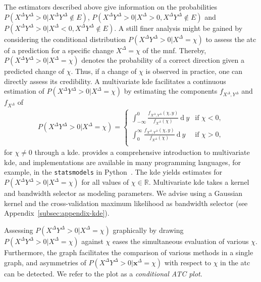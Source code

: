 \documentclass[pdflatex]{sn-jnl}
\theoremstyle{plain}%
\theoremstyle{definition}
\newcommand{\R}{\mathbb{R}}
\newcommand{\diffx}{\mathbf{x}^{\Delta}}
\newcommand{\diffxrv}{X^{\Delta}}
\newcommand{\diffyrv}{Y^{\Delta}}
\newcommand{\xcond}{\chi}
\begin{document}
The estimators described above give information on the probabilities $P(\diffxrv \diffyrv > 0 | \diffxrv \diffyrv \notin E)$, $P(\diffxrv \diffyrv > 0 | \diffxrv > 0, \diffxrv \diffyrv \notin E)$ and $P(\diffxrv \diffyrv > 0 | \diffxrv < 0, \diffxrv \diffyrv \notin E)$.
A still finer analysis might be gained by considering the conditional distribution $P(\diffxrv \diffyrv > 0 | \diffxrv = \xcond)$ to assess the \ac{atc} of a prediction for a specific change $\diffxrv = \xcond$ of the \ac{mnf}.
Thereby, $P(\diffxrv \diffyrv > 0 | \diffxrv = \xcond)$ denotes the probability of a correct direction given a predicted change of $\xcond$.
Thus, if a change of $\xcond$ is observed in practice, one can directly assess its credibility.
A multivariate \acf{kde} facilitates a continuous estimation of $P(\diffxrv \diffyrv > 0 | \diffxrv = \xcond)$ by estimating the components $f_{\diffxrv, \diffyrv}$ and $f_{\diffxrv}$ of
\begin{align*}
P(\diffxrv \diffyrv > 0 | \diffxrv = \xcond) = \begin{cases}
                                              \int_{-\infty}^0 \frac{f_{\diffxrv, \diffyrv}(\xcond, y)}{f_{\diffxrv}(\xcond)} \ \textrm{d} \: y & \text{if } \xcond < 0, \\
                                              \int_{0}^{\infty} \frac{f_{\diffxrv, \diffyrv}(\xcond, y)}{f_{\diffxrv}(\xcond)} \ \textrm{d} \: y & \text{if } \xcond > 0, \\
\end{cases}
\end{align*}
for $\xcond \neq 0$ through a \ac{kde}.
\textcite{Gramacki2018} provides a comprehensive introduction to multivariate \ac{kde}, and implementations are available in many programming languages, for example, in the \verb|statsmodels| in Python~\parencite{Seabold2010}.
The \ac{kde} yields estimates for $P(\diffxrv \diffyrv > 0 | \diffxrv = \xcond)$ for all values of $\xcond \in \R$.
Multivariate \ac{kde} takes a kernel and bandwidth selector as modeling parameters.
We advise using a Gaussian kernel and the cross-validation maximum likelihood as bandwidth selector (see Appendix~\ref{subsec:appendix-kde}).

Assessing $P(\diffxrv \diffyrv > 0 | \diffxrv = \xcond)$ graphically by drawing $P(\diffxrv \diffyrv > 0 | \diffxrv = \xcond)$ against $\xcond$ eases the simultaneous evaluation of various $\xcond$.
Furthermore, the graph facilitates the comparison of various methods in a single graph, and asymmetries of $P(\diffxrv \diffyrv > 0 | \diffx = \xcond)$ with respect to $\xcond$ in the \ac{atc} can be detected.
We refer to the plot as a \textit{conditional ATC plot}.
\end{document}
